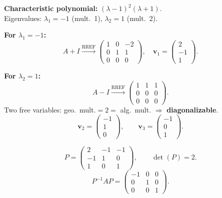 \documentclass[12pt,a3paper]{article}
\begin{document}
\begin{tcolorbox}[enhanced,breakable,
  colback=cE!4,colframe=cE,boxrule=0.8pt,arc=5pt,
  title={\textbf{Answer --- Diagonalization of
    $A=\begin{pmatrix}-1&-2&-2\\1&2&1\\-1&-1&0\end{pmatrix}$}},
  fonttitle=\bfseries\color{white},colbacktitle=cE]

\textbf{Characteristic polynomial:} $(\lambda-1)^2(\lambda+1)$.\\
Eigenvalues: $\lambda_1=-1$ (mult.\ 1),\; $\lambda_2=1$ (mult.\ 2).

\textbf{For $\lambda_1=-1$:}
\[
  A+I\xrightarrow{\text{RREF}}\begin{pmatrix}1&0&-2\\0&1&1\\0&0&0\end{pmatrix},\quad
  \mathbf{v}_1=\begin{pmatrix}2\\-1\\1\end{pmatrix}.
\]

\textbf{For $\lambda_2=1$:}
\[
  A-I\xrightarrow{\text{RREF}}\begin{pmatrix}1&1&1\\0&0&0\\0&0&0\end{pmatrix}.
\]
Two free variables: geo.\ mult.$=2=$ alg.\ mult. $\Rightarrow$ \textbf{diagonalizable}.
\[
  \mathbf{v}_2=\begin{pmatrix}-1\\1\\0\end{pmatrix},\qquad
  \mathbf{v}_3=\begin{pmatrix}-1\\0\\1\end{pmatrix}.
\]

\[
  P=\begin{pmatrix}2&-1&-1\\-1&1&0\\1&0&1\end{pmatrix},\qquad \det(P)=2.
\]
\[
  \boxed{P^{-1}AP=\begin{pmatrix}-1&0&0\\0&1&0\\0&0&1\end{pmatrix}.}
\]

\end{tcolorbox}
\end{document}
